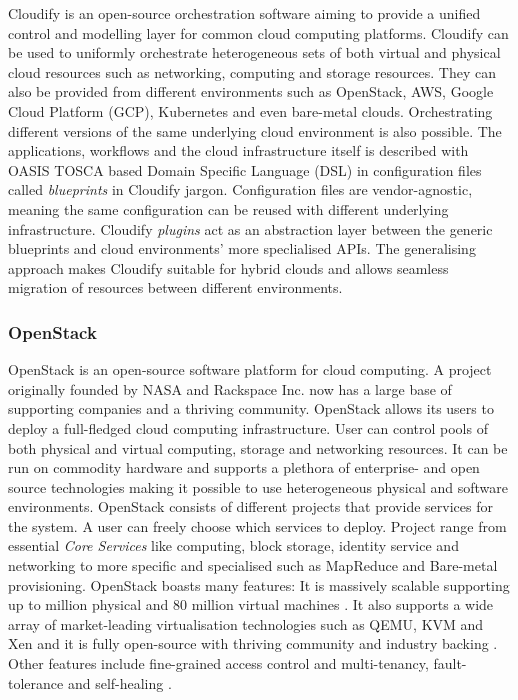 Cloudify \cite{cloudify} is an open-source orchestration software aiming to provide a unified control and modelling layer for common cloud computing platforms. Cloudify can be used to uniformly orchestrate heterogeneous sets of both virtual and physical cloud resources such as networking, computing and storage resources. They can also be provided from different environments such as OpenStack, AWS, Google Cloud Platform (GCP), Kubernetes and even bare-metal clouds. Orchestrating different versions of the same underlying cloud environment is also possible. The applications, workflows and the cloud infrastructure itself is described with OASIS TOSCA \cite{Tosca} based Domain Specific Language (DSL) in configuration files called \textit{blueprints} in Cloudify jargon. Configuration files are vendor-agnostic, meaning the same configuration can be reused with different underlying infrastructure. Cloudify \textit{plugins} act as an abstraction layer between the generic blueprints and cloud environments' more speclialised APIs. The generalising approach makes Cloudify suitable for hybrid clouds and allows seamless migration of resources between different environments.

\subsubsection{OpenStack}

OpenStack \cite{openstackproject} is an open-source software platform for cloud computing. A project originally founded by NASA and Rackspace Inc. now has a large base of supporting companies  \cite{openstackpartners} and a thriving community.
	OpenStack allows its users to deploy a full-fledged cloud computing infrastructure. User can control pools of both physical and virtual computing, storage and networking resources. It can be run on commodity hardware and supports a plethora of enterprise- and open source technologies making it possible to use heterogeneous physical and software environments.
	OpenStack consists of different projects that provide services for the system. A user can freely choose which services to deploy. Project range from essential \textit{Core Services} like computing, block storage, identity service and networking to more specific and specialised such as MapReduce and Bare-metal provisioning\cite{openstackproject}. OpenStack boasts many features: It is massively scalable supporting up to million physical and 80 million virtual machines \cite{openstack}. It also supports a wide array of market-leading virtualisation technologies such as QEMU, KVM and Xen and it is fully open-source with thriving community and industry backing \cite{openstackpartners}. Other features include fine-grained access control and multi-tenancy, fault-tolerance and self-healing \cite{openstackfeatures}.

